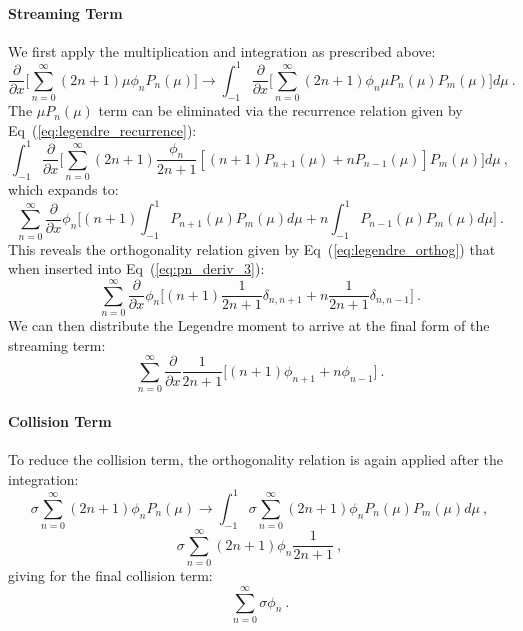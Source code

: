 \documentclass[letterpaper,12pt]{article}
\begin{document}
\paragraph{Streaming Term}
We first apply the multiplication and integration as prescribed above:
\begin{equation}
  \frac{\partial}{\partial x}\Bigg[\sum_{n=0}^\infty (2n+1) \mu \phi_n
    P_n(\mu) \Bigg] \rightarrow \int_{-1}^1 \frac{\partial}{\partial
    x}\Bigg[\sum_{n=0}^\infty (2n+1) \phi_n \mu P_n(\mu) P_m(\mu) \Bigg]
  d \mu\:.
  \label{eq:pn_deriv_2}
\end{equation}
The $\mu P_n(\mu)$ term can be eliminated via the recurrence relation
given by Eq~(\ref{eq:legendre_recurrence}):
\begin{equation}
\int_{-1}^1 \frac{\partial}{\partial x}\Bigg[\sum_{n=0}^\infty (2n+1)
  \frac{\phi_n}{2n+1}[(n+1)P_{n+1}(\mu) + n P_{n-1}(\mu)] P_m(\mu)
  \Bigg] d\mu\:,
\label{eq:pn_deriv_3}
\end{equation}
which expands to:
\begin{equation}
  \sum_{n=0}^\infty \frac{\partial}{\partial
    x}\phi_n\Bigg[(n+1)\int_{-1}^1 P_{n+1}(\mu)P_m(\mu) d\mu + n
    \int_{-1}^1 P_{n-1}(\mu) P_m(\mu) d\mu \Bigg] \:.
  \label{eq:pn_deriv_4}
\end{equation}
This reveals the orthogonality relation given by
Eq~(\ref{eq:legendre_orthog}) that when inserted into
Eq~(\ref{eq:pn_deriv_3}):
\begin{equation}
  \sum_{n=0}^\infty \frac{\partial}{\partial
    x}\phi_n\Bigg[(n+1)\frac{1}{2n+1}\delta_{n,n+1} +
    n\frac{1}{2n+1}\delta_{n,n-1} \Bigg] \:.
  \label{eq:pn_deriv_5}
\end{equation}
We can then distribute the Legendre moment to arrive at the final form
of the streaming term:
\begin{equation}
  \sum_{n=0}^\infty \frac{\partial}{\partial x} \frac{1}{2n+1} \Big[
    (n+1) \phi_{n+1} + n \phi_{n-1} \Big] \:.
  \label{eq:pn_deriv_6}
\end{equation}

\paragraph{Collision Term}
To reduce the collision term, the orthogonality relation is again
applied after the integration:
\begin{equation}
  \sigma \sum_{n=0}^\infty (2n+1) \phi_n P_n(\mu) \rightarrow
  \int_{-1}^1 \sigma \sum_{n=0}^\infty (2n+1) \phi_n P_n(\mu) P_m(\mu)
  d\mu\:,
  \label{eq:pn_deriv_7}
\end{equation}
\begin{equation}
  \sigma \sum_{n=0}^\infty (2n+1) \phi_n \frac{1}{2n+1}\:,
  \label{eq:pn_deriv_8}
\end{equation}
giving for the final collision term:
\begin{equation}
  \sum_{n=0}^\infty \sigma \phi_n \:.
  \label{eq:pn_deriv_9}
\end{equation}
\end{document}
